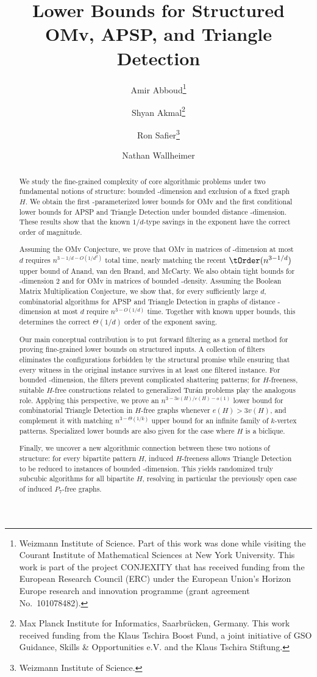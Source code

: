 \documentclass[11pt]{article}
\date{}
\author{Amir Abboud\thanks{Weizmann Institute of Science. Part of this work was done while visiting the Courant Institute of Mathematical Sciences at New York University. This work is part of the project CONJEXITY that has received funding from the European Research Council (ERC) under the European Union's Horizon Europe research and innovation programme (grant agreement No.~101078482).}
 \and Shyan Akmal\orcidlink{0000-0002-1825-0097}\thanks{Max Planck Institute for Informatics, Saarbr\"ucken, Germany. This work received funding from the Klaus Tschira Boost Fund, a joint initiative of GSO Guidance, Skills \& Opportunities e.V. and the Klaus Tschira Stiftung.}
 \and Ron Safier\thanks{Weizmann Institute of Science.}
 \and Nathan Wallheimer\footnotemark[3]
 }
\title{Lower Bounds for Structured OMv, APSP, and Triangle Detection}
\begin{document}
   \hypersetup{pageanchor=false}
   \maketitle 
   \begin{abstract}
      We study the fine-grained complexity of core algorithmic problems under two fundamental notions of structure: bounded \VC-dimension and exclusion of a fixed graph $H$. We obtain the first \VC-parameterized lower bounds for OMv and the first conditional lower bounds for APSP and Triangle Detection under bounded distance \VC-dimension. These results show that the known $1/d$-type savings in the exponent have the correct order of magnitude.

      Assuming the OMv Conjecture, we prove that OMv in matrices of \VC-dimension at most $d$ requires $n^{3-1/d-O(1/d^2)}$ total time, nearly matching the recent $\tOrder(n^{3-1/d})$ upper bound of Anand, van den Brand, and McCarty. We also obtain tight bounds for \VC-dimension $2$ and for OMv in matrices of bounded \VC-density. Assuming the Boolean Matrix Multiplication Conjecture, we show that, for every sufficiently large $d$, combinatorial algorithms for APSP and Triangle Detection in graphs of distance \VC-dimension at most $d$ require $n^{3-O(1/d)}$ time. Together with known upper bounds, this determines the correct $\Theta(1/d)$ order of the exponent saving. 

      Our main conceptual contribution is to put forward filtering as a general method for proving fine-grained lower bounds on structured inputs. A collection of filters eliminates the configurations forbidden by the structural promise while ensuring that every witness in the original instance survives in at least one filtered instance. For bounded \VC-dimension, the filters prevent complicated shattering patterns; for $H$-freeness, suitable $H$-free constructions related to generalized Tur\'an problems play the analogous role. Applying this perspective, we prove an $n^{3-3v(H)/e(H)-o(1)}$ lower bound for combinatorial Triangle Detection in $H$-free graphs whenever $e(H)>3v(H)$, and complement it with matching $n^{3-\Theta(1/k)}$ upper bound for an infinite family of $k$-vertex patterns. Specialized lower bounds are also given for the case where $H$ is a biclique. 

      Finally, we uncover a new algorithmic connection between these two notions of structure: for every bipartite pattern $H$, induced $H$-freeness allows Triangle Detection to be reduced to instances of bounded \VC-dimension. This yields randomized truly subcubic algorithms for all bipartite $H$, resolving in particular the previously open case of induced $P_7$-free graphs.
   \end{abstract}
   \clearpage
   \tableofcontents
   \clearpage
   \setcounter{page}{1}
   \hypersetup{pageanchor=true}
\end{document}
